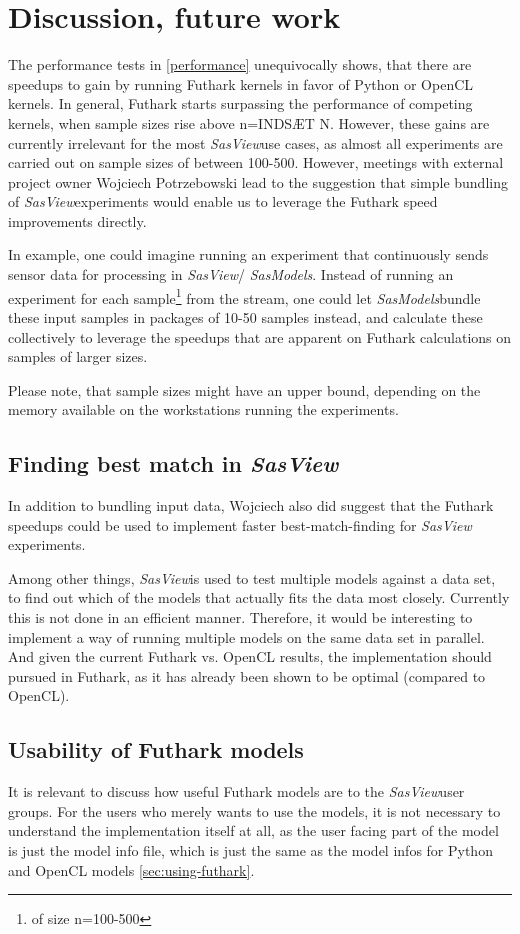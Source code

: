 \documentclass[11pt]{article}
\newcommand{\sasmodels}{\textit{SasModels}}
\newcommand{\sasview}{\textit{SasView}}
\begin{document}
\section{Discussion, future work}
\label{sec:discussion}
The performance tests in \ref{performance} unequivocally shows, that
there are speedups to gain by running Futhark kernels in favor of Python or
OpenCL kernels.
In general, Futhark starts surpassing the performance of competing kernels, when
sample sizes rise above n=INDSÆT N. However, these gains are currently
irrelevant for the most \sasview use cases, as almost all
experiments are carried out on sample sizes of between 100-500.
However, meetings with external project owner Wojciech Potrzebowski lead to the
suggestion that simple bundling of \sasview experiments would enable us
to leverage the Futhark speed improvements directly.

In example, one could imagine running an experiment that continuously sends
sensor data for processing in \sasview / \sasmodels.
Instead of running an experiment for each sample\footnote{of size n=100-500}
from the stream, one could let \sasmodels bundle these input samples in packages
of 10-50 samples
instead, and calculate these collectively to leverage the speedups that are
apparent on Futhark calculations on samples of larger sizes.

Please note, that sample sizes might have an upper bound, depending on the
memory available on the workstations running the experiments.

\subsection{Finding best match in \sasview}
\label{sec:best-match}
In addition to bundling input data, Wojciech also did suggest that the Futhark
speedups could be used to implement faster best-match-finding for \sasview
experiments.

Among other things, \sasview is used to test multiple models against a data set,
to find out which of the models that actually fits the data most closely.
Currently this is not done in an efficient manner.
Therefore, it would be interesting to implement a way of running multiple models
on the same data set in parallel.
And given the current Futhark vs. OpenCL results, the implementation should
pursued in Futhark, as it has already been shown to be optimal
(compared to OpenCL).


\subsection{Usability of Futhark models}
It is relevant to discuss how useful Futhark models are to the \sasview user
groups. For the users who merely wants to use the models, it is not necessary
to understand the implementation itself at all, as the user facing part of
the model is just the model info file, which is just the same as the model infos
for Python and OpenCL models \ref{sec:using-futhark}.
\end{document}
